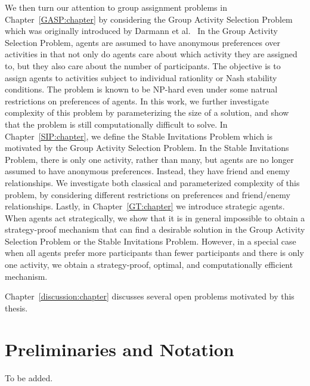 We then turn our attention to group assignment problems in Chapter~\ref{GASP:chapter} by considering the Group Activity Selection Problem which was originally introduced by Darmann et al.~\cite{GASP12WINE} In the Group Activity Selection Problem, agents are assumed to have anonymous preferences over activities in that not only do agents care about which activity they are assigned to, but they also care about the number of participants. The objective is to assign agents to activities subject to individual rationlity or Nash stability conditions. The problem is known to be NP-hard even under some natrual restrictions on preferences of agents. In this work, we further investigate complexity of this problem by parameterizing the size of a solution, and show that the problem is still computationally difficult to solve. In Chapter~\ref{SIP:chapter}, we define the Stable Invitations Problem which is motivated by the Group Activity Selection Problem. In the Stable Invitations Problem, there is only one activity, rather than many, but agents are no longer assumed to have anonymous preferences. Instead, they have friend and enemy relationships. We investigate both classical and parameterized complexity of this problem, by considering different restrictions on preferences and friend/enemy relationships. Lastly, in Chapter~\ref{GT:chapter} we introduce strategic agents. When agents act strategically, we show that it is in general impossible to obtain a strategy-proof mechanism that can find a desirable solution in the Group Activity Selection Problem or the Stable Invitations Problem. However, in a special case when all agents prefer more participants than fewer participants and there is only one activity, we obtain a strategy-proof, optimal, and computationally efficient mechanism. 

Chapter~\ref{discussion:chapter} discusses several open problems motivated by this thesis. 


\section{Preliminaries and Notation}

To be added.

